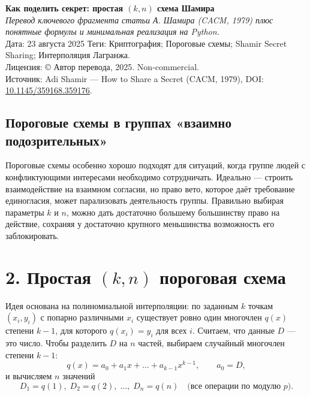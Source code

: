 \documentclass[a4paper,12pt]{article}
\begin{document}
\begin{center}
{\LARGE \textbf{Как поделить секрет: простая $(k, n)$ схема Шамира}}\\[0.5em]
\emph{Перевод ключевого фрагмента статьи А. Шамира (CACM, 1979) плюс понятные формулы и минимальная реализация на Python.}\\[0.5em]
\small Дата: 23 августа 2025 \quad
Теги: Криптография; Пороговые схемы; Shamir Secret Sharing; Интерполяция Лагранжа.\\[0.25em]
\small Лицензия: © Автор перевода, 2025. Non-commercial.\\[0.25em]
\small Источник: Adi Shamir — How to Share a Secret (CACM, 1979), DOI: \href{https://doi.org/10.1145/359168.359176}{10.1145/359168.359176}.
\end{center}

\vspace{1em}

\subsection*{Пороговые схемы в группах «взаимно подозрительных»}

Пороговые схемы особенно хорошо подходят для ситуаций, когда группе людей с конфликтующими интересами необходимо сотрудничать. Идеально — строить взаимодействие на взаимном согласии, но право вето, которое даёт требование единогласия, может парализовать деятельность группы. Правильно выбирая параметры $k$ и $n$, можно дать достаточно большему большинству право на действие, сохраняя у достаточно крупного меньшинства возможность его заблокировать.

\section*{2. Простая $(k,n)$ пороговая схема}

Идея основана на полиномиальной интерполяции: по заданным $k$ точкам $(x_i, y_i)$ с попарно различными $x_i$ существует ровно один многочлен $q(x)$ степени $k-1$, для которого $q(x_i) = y_i$ для всех $i$. Считаем, что данные $D$ — это число. Чтобы разделить $D$ на $n$ частей, выбираем случайный многочлен степени $k-1$:
\begin{equation*}
q(x)=a_0 + a_1 x + \dots + a_{k-1} x^{k-1},\qquad a_0 = D,
\end{equation*}
и вычисляем $n$ значений
\begin{equation*}
D_1 = q(1),\; D_2 = q(2),\; \dots,\; D_n = q(n)
\quad\text{(все операции по модулю }p\text{)}.
\end{equation*}
\end{document}

